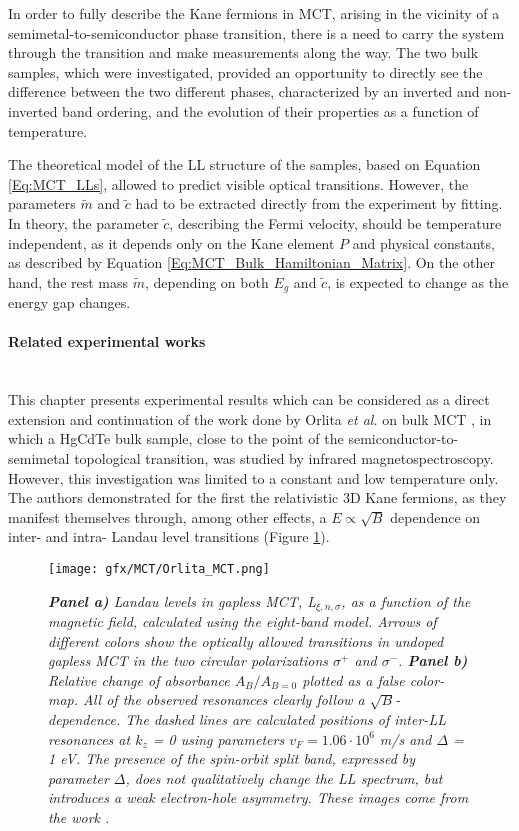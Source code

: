 \documentclass[titlepage,a4paper]{book}
\newcommand{\wciecie}{\quad\phantom{v}}
\newcommand{\myparagraph}[1]{\paragraph{#1}\mbox{}\\}
\begin{document}
In order to fully describe the Kane fermions in MCT, arising in the vicinity of a semimetal-to-semiconductor phase transition, there is a need to carry the system through the transition and make measurements along the way. The two bulk samples, which were investigated, provided an opportunity to directly see the difference between the two different phases, characterized by an inverted and non-inverted band ordering, and the evolution of their properties as a function of temperature.  

The theoretical model of the LL structure of the samples, based on Equation \ref{Eq:MCT_LLs}, allowed to predict visible optical transitions. However, the parameters $\tilde{m}$ and $\tilde c$ had to be extracted directly from the experiment by fitting. In theory, the parameter $\tilde c$, describing the Fermi velocity, should be temperature independent, as it depends only on the Kane element $P$ and physical constants, as described by Equation \ref{Eq:MCT_Bulk_Hamiltonian_Matrix}. On the other hand, the rest mass $\tilde{m}$, depending on both $E_g$ and $\tilde{c}$, is expected to change as the energy gap changes.

\myparagraph{Related experimental works}
\wciecie
This chapter presents experimental results which can be considered as a direct extension and continuation of the work done by Orlita \textit{et al.} on bulk MCT \cite{Orlita_MCT}, in which a HgCdTe bulk sample, close to the point of the semiconductor-to-semimetal topological transition, was studied by infrared magnetospectroscopy. However, this investigation was limited to a constant and low temperature only. The authors demonstrated for the first the relativistic 3D Kane fermions, as they manifest themselves through, among other effects, a $E \propto \sqrt{B}$ dependence on inter- and intra- Landau level transitions (Figure \ref{fig:Orlita_MCT}). 

\begin{figure}[ht]
	\centering
	\texttt{[image: gfx/MCT/Orlita\_MCT.png]}
	\vspace{-10pt}
	\caption{\textit{\textbf{Panel a)} Landau levels in gapless MCT, L$_{\xi,n,\sigma}$, as a function of the magnetic field, calculated using the eight-band model. Arrows of different colors show the optically allowed transitions in undoped gapless MCT in the two circular polarizations $\sigma^{+}$ and $\sigma^{-}$. \textbf{Panel b)} Relative change of absorbance $A_B/A_{B=0}$ plotted as a false color-map. All of the observed resonances clearly follow a $\sqrt{B}$-dependence. The dashed lines are calculated positions of inter-LL resonances at $k_z$ = 0 using parameters $v_F = 1.06 \cdot 10^6$ m/s and $\Delta$ = 1 eV. The presence of the spin-orbit split band, expressed by parameter $\Delta$, does not qualitatively change the LL spectrum, but introduces a weak electron-hole asymmetry. These images come from the work \cite{Orlita_MCT}.}}
	\label{fig:Orlita_MCT}
\end{figure}
\end{document}
